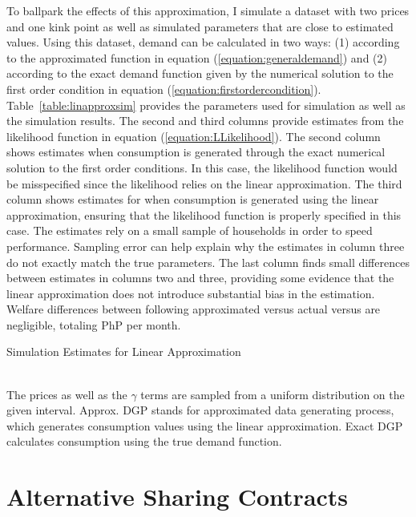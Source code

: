 \documentclass[12pt]{article}
\begin{document}
\begin{appendices}
To ballpark the effects of this approximation, I simulate a dataset with two prices and one kink point as well as simulated parameters that are close to estimated values.  Using this dataset, demand can be calculated in two ways: (1) according to the approximated function in equation (\ref{equation:generaldemand}) and (2) according to the exact demand function given by the numerical solution to the first order condition in equation (\ref{equation:firstordercondition}).  Table~\ref{table:linapproxsim} provides the parameters used for simulation as well as the simulation results.  The second and third columns provide estimates from the likelihood function in equation (\ref{equation:LLikelihood}).  The second column shows estimates when consumption is generated through the exact numerical solution to the first order conditions.  In this case, the likelihood function would be misspecified since the likelihood relies on the linear approximation.  The third column shows estimates for when consumption is generated using the linear approximation, ensuring that the likelihood function is properly specified in this case.  The estimates rely on a small sample of households in order to speed performance.  Sampling error can help explain why the estimates in column three do not exactly match the true parameters.  The last column finds small differences between estimates in columns two and three, providing some evidence that the linear approximation does not introduce substantial bias in the estimation.  Welfare differences between following  approximated versus actual versus are negligible, totaling PhP per month.

\begin{table}
\caption{Simulation Estimates for Linear Approximation}\label{table:linapproxsim}
\centering
 \\
\footnotesize{The prices as well as the $\gamma$ terms are sampled from a uniform distribution on the given interval.  Approx. DGP stands for approximated data generating process, which generates consumption values using the linear approximation.  Exact DGP calculates consumption using the true demand function.   }
\end{table}



\section{Alternative Sharing Contracts}\label{appendix:fixedprice}


\end{appendices}
\end{document}
